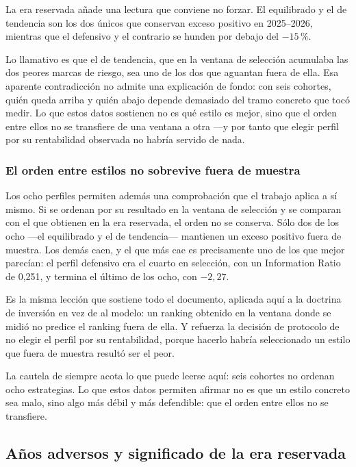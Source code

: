 La era reservada añade una lectura que conviene no forzar. El equilibrado y el de tendencia son los
dos únicos que conservan exceso positivo en 2025--2026, mientras que el defensivo y el contrario se
hunden por debajo del $-15$\,\%.

Lo llamativo es que el de tendencia, que en la ventana de selección acumulaba las dos peores marcas
de riesgo, sea uno de los dos que aguantan fuera de ella. Esa aparente contradicción no admite una
explicación de fondo: con seis cohortes, quién queda arriba y quién abajo depende demasiado del
tramo concreto que tocó medir. Lo que estos datos sostienen no es qué estilo es mejor, sino que el
orden entre ellos no se transfiere de una ventana a otra ---y por tanto que elegir perfil por su
rentabilidad observada no habría servido de nada.

\subsubsection*{El orden entre estilos no sobrevive fuera de muestra}

Los ocho perfiles permiten además una comprobación que el trabajo aplica a sí mismo. Si se ordenan
por su resultado en la ventana de selección y se comparan con el que obtienen en la era reservada,
el orden no se conserva. Sólo dos de los ocho ---el equilibrado y el de tendencia---
mantienen un exceso positivo fuera de muestra. Los demás caen, y el que más cae es precisamente uno
de los que mejor parecían: el perfil defensivo era el cuarto en selección, con un Information Ratio
de 0,251, y termina el último de los ocho, con $-2{,}27$.

Es la misma lección que sostiene todo el documento, aplicada aquí a la doctrina de inversión en vez
de al modelo: un ranking obtenido en la ventana donde se midió no predice el ranking fuera de ella.
Y refuerza la decisión de protocolo de no elegir el perfil por su rentabilidad, porque hacerlo
habría seleccionado un estilo que fuera de muestra resultó ser el peor.

La cautela de siempre acota lo que puede leerse aquí: seis cohortes no ordenan ocho estrategias. Lo
que estos datos permiten afirmar no es que un estilo concreto sea malo, sino algo más débil y más
defendible: que el orden entre ellos no se transfiere.

\subsection{Años adversos y significado de la era reservada}
\label{sec:era-reservada}

